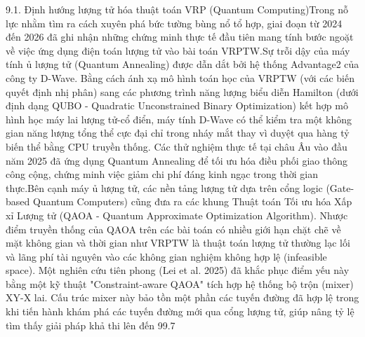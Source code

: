 \documentclass[13pt, a4paper]{extarticle} %
\begin{document}
9.1. Định hướng lượng tử hóa thuật toán VRP (Quantum Computing)Trong nỗ lực nhằm tìm ra cách xuyên phá bức tường bùng nổ tổ hợp, giai đoạn từ 2024 đến 2026 đã ghi nhận những chứng minh thực tế đầu tiên mang tính bước ngoặt về việc ứng dụng điện toán lượng tử vào bài toán VRPTW.Sự trỗi dậy của máy tính ủ lượng tử (Quantum Annealing) được dẫn dắt bởi hệ thống Advantage2 của công ty D-Wave. Bằng cách ánh xạ mô hình toán học của VRPTW (với các biến quyết định nhị phân) sang các phương trình năng lượng biểu diễn Hamilton (dưới định dạng QUBO - Quadratic Unconstrained Binary Optimization) kết hợp mô hình học máy lai lượng tử-cổ điển, máy tính D-Wave có thể kiểm tra một không gian năng lượng tổng thể cực đại chỉ trong nháy mắt thay vì duyệt qua hàng tỷ biến thể bằng CPU truyền thống. Các thử nghiệm thực tế tại châu Âu vào đầu năm 2025 đã ứng dụng Quantum Annealing để tối ưu hóa điều phối giao thông công cộng, chứng minh việc giảm chi phí đáng kinh ngạc trong thời gian thực.Bên cạnh máy ủ lượng tử, các nền tảng lượng tử dựa trên cổng logic (Gate-based Quantum Computers) cũng đưa ra các khung Thuật toán Tối ưu hóa Xấp xỉ Lượng tử (QAOA - Quantum Approximate Optimization Algorithm). Nhược điểm truyền thống của QAOA trên các bài toán có nhiều giới hạn chặt chẽ về mặt không gian và thời gian như VRPTW là thuật toán lượng tử thường lạc lối và lãng phí tài nguyên vào các không gian nghiệm không hợp lệ (infeasible space). Một nghiên cứu tiên phong (Lei et al. 2025) đã khắc phục điểm yếu này bằng một kỹ thuật "Constraint-aware QAOA" tích hợp hệ thống bộ trộn (mixer) XY-X lai. Cấu trúc mixer này bảo tồn một phần các tuyến đường đã hợp lệ trong khi tiến hành khám phá các tuyến đường mới qua cổng lượng tử, giúp nâng tỷ lệ tìm thấy giải pháp khả thi lên đến 99.7%
\end{document}
